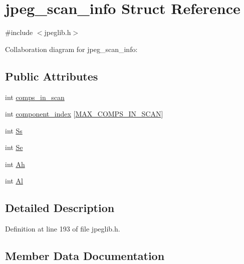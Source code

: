 \hypertarget{structjpeg__scan__info}{}\section{jpeg\+\_\+scan\+\_\+info Struct Reference}
\label{structjpeg__scan__info}


{\ttfamily \#include $<$jpeglib.\+h$>$}



Collaboration diagram for jpeg\+\_\+scan\+\_\+info\+:
\subsection*{Public Attributes}
\begin{DoxyCompactItemize}
\item 
int \mbox{\hyperlink{structjpeg__scan__info_addd94bff3ee52f961cf6fda5ea86ddca}{comps\+\_\+in\+\_\+scan}}
\item 
int \mbox{\hyperlink{structjpeg__scan__info_a041f1af60508517345c1b76c48ee6567}{component\+\_\+index}} \mbox{[}\mbox{\hyperlink{jpeglib_8h_adc7013da016c19051dc623fb3d8b35b4}{M\+A\+X\+\_\+\+C\+O\+M\+P\+S\+\_\+\+I\+N\+\_\+\+S\+C\+AN}}\mbox{]}
\item 
int \mbox{\hyperlink{structjpeg__scan__info_a33bc5abcded36ccd1b4c2ec94f6e2ba5}{Ss}}
\item 
int \mbox{\hyperlink{structjpeg__scan__info_a4eefb8be0412f78566862c28a20fb254}{Se}}
\item 
int \mbox{\hyperlink{structjpeg__scan__info_a43834ca9482c7ea12cc97cf602da004b}{Ah}}
\item 
int \mbox{\hyperlink{structjpeg__scan__info_a89cc9e990977c50b2b2058e6b9526e67}{Al}}
\end{DoxyCompactItemize}


\subsection{Detailed Description}


Definition at line 193 of file jpeglib.\+h.



\subsection{Member Data Documentation}
\mbox{\label{structjpeg__scan__info_a43834ca9482c7ea12cc97cf602da004b}} 
